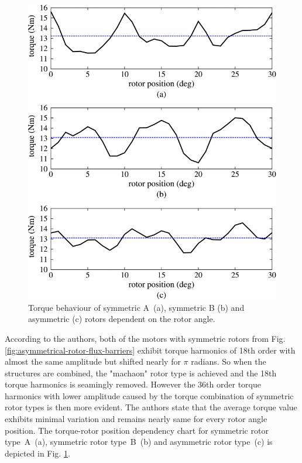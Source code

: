 \documentclass[a4paper, twoside, 11pt]{article}
\begin{document}
    \begin{minipage}[t]{0.45\textwidth}
        \begin{figure}[H]
            \centering
            \includegraphics[width=1\textwidth]{src/png/torque-rotor-position-asymmetric-motor.png}
            \caption{Torque behaviour of symmetric A~(a), symmetric B (b) and asymmetric (c) rotors dependent on the rotor angle. \cite{bianchi-Experimental-comparison-of-PM-assisted-synchronous-reluctance-motors}}
            \label{fig:torque-rotor-position-asymmetric-motor}
        \end{figure}
    \end{minipage}%
    \FloatBarrier
    
    \vspace*{0.75cm}
    According to the \cite{bianchi-Experimental-comparison-of-PM-assisted-synchronous-reluctance-motors} authors, both of the motors with symmetric rotors from Fig. \ref{fig:asymmetrical-rotor-flux-barriers} exhibit torque harmonics of 18th order with almost the same amplitude but shifted nearly for $\pi$ radians. So when the structures are combined, the "machaon" rotor type is achieved and the 18th torque harmonics is seamingly removed. However the 36th order torque harmonics with lower amplitude caused by the torque combination of symmetric rotor types is then more evident. The authors state that the average torque value exhibits minimal variation and remains nearly same for every rotor angle position. The torque-rotor position dependency chart for symmetric rotor type~A~(a), symmetric rotor type~B~(b) and asymmetric rotor type~(c) is depicted in Fig. \ref{fig:torque-rotor-position-asymmetric-motor}.
\end{document}
